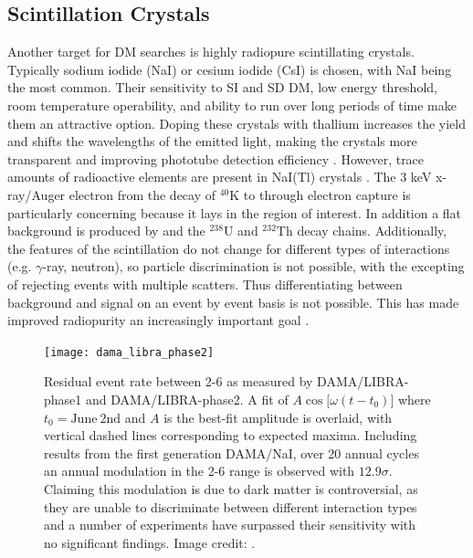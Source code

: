 \subsection{Scintillation Crystals}
\label{subsec:crystals}
Another target for DM searches is highly radiopure scintillating crystals.  Typically sodium iodide (NaI) or cesium iodide (CsI) is
chosen, with NaI being the most common.  Their sensitivity to SI
and SD DM, low energy threshold, room temperature operability, and ability to run over long periods of time
make them an attractive option.  Doping these crystals with thallium increases the yield and shifts the wavelengths of the emitted light,
making the crystals
more transparent and improving phototube detection efficiency .  However, trace amounts of radioactive elements
are present in NaI(Tl) crystals .  The 3 keV x-ray/Auger electron from the decay of
$^{40}$K to  through electron capture is particularly concerning because it lays in the region of interest.  In addition a
flat background is produced by  and the $^{238}$U and $^{232}$Th decay chains.  Additionally, the features of the
scintillation
do not change for different types of interactions (e.g. $\gamma$-ray, neutron), so particle discrimination is not possible, with the
excepting of rejecting events with multiple scatters.  Thus differentiating between background and signal on an event by event basis is
not possible.  This has made improved radiopurity an increasingly important goal .

\begin{figure}
\centering
\texttt{[image: dama\_libra\_phase2]}
\caption[Residual event rate between 2-6 \kevee as measured by DAMA/LIBRA-phase1 and DAMA/LIBRA-phase2.  A fit of
$A \cos \lbrack \omega (t - t_{0}) \rbrack $ where $t_{0} = \mathrm{June\ 2nd}$ and $A$ is the best-fit amplitude is overlaid, with vertical
dashed lines corresponding to expected
maxima.]{Residual event rate between 2-6 \kevee as measured by DAMA/LIBRA-phase1 and DAMA/LIBRA-phase2.  A fit of
$A \cos \lbrack \omega (t - t_{0}) \rbrack$ where
$t_{0} = \mathrm{June\ 2nd}$ and $A$ is the best-fit amplitude is overlaid, with vertical dashed lines corresponding to expected
maxima.  Including results from the first generation DAMA/NaI, over 20 annual cycles an annual modulation in the 2-6 \kevee
range is observed with $12.9\sigma$.  Claiming this modulation is due to dark matter is controversial, as they are unable to
discriminate between different interaction types and a number of experiments have surpassed their sensitivity with no significant
findings.  Image credit: .}
\label{fig:dama}
\end{figure}

